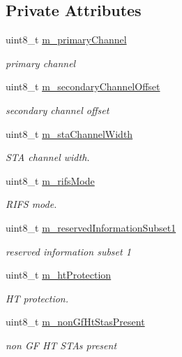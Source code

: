 \subsection*{Private Attributes}
\begin{DoxyCompactItemize}
\item 
uint8\+\_\+t \hyperlink{classns3_1_1HtOperation_afcbf76590baa192cc8b33b4b6e8e6650}{m\+\_\+primary\+Channel}
\begin{DoxyCompactList}\small\item\em primary channel \end{DoxyCompactList}\item 
uint8\+\_\+t \hyperlink{classns3_1_1HtOperation_a4ad5d94805d6910d6701d47ed4a521c7}{m\+\_\+secondary\+Channel\+Offset}
\begin{DoxyCompactList}\small\item\em secondary channel offset \end{DoxyCompactList}\item 
uint8\+\_\+t \hyperlink{classns3_1_1HtOperation_a62eb3d7e3ee0f1ef68acd2039369f36e}{m\+\_\+sta\+Channel\+Width}
\begin{DoxyCompactList}\small\item\em S\+TA channel width. \end{DoxyCompactList}\item 
uint8\+\_\+t \hyperlink{classns3_1_1HtOperation_a4984fc439a00d647d482f0d1440c7649}{m\+\_\+rifs\+Mode}
\begin{DoxyCompactList}\small\item\em R\+I\+FS mode. \end{DoxyCompactList}\item 
uint8\+\_\+t \hyperlink{classns3_1_1HtOperation_a160865d81990b042b21177784683d90c}{m\+\_\+reserved\+Information\+Subset1}
\begin{DoxyCompactList}\small\item\em reserved information subset 1 \end{DoxyCompactList}\item 
uint8\+\_\+t \hyperlink{classns3_1_1HtOperation_aeb7ef7d820bbb26c46ca3ca7dc91845e}{m\+\_\+ht\+Protection}
\begin{DoxyCompactList}\small\item\em HT protection. \end{DoxyCompactList}\item 
uint8\+\_\+t \hyperlink{classns3_1_1HtOperation_afedba73290aa71c7d5d09a88344b0d6f}{m\+\_\+non\+Gf\+Ht\+Stas\+Present}
\begin{DoxyCompactList}\small\item\em non GF HT S\+T\+As present \end{DoxyCompactList}\item 

\end{DoxyCompactItemize}
